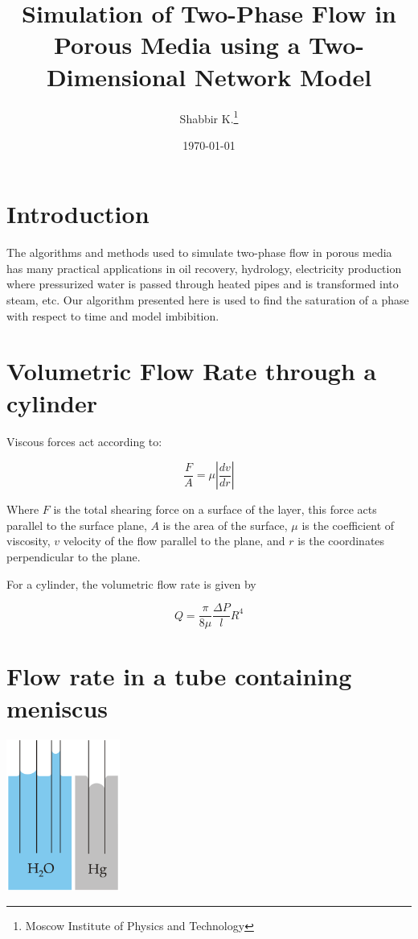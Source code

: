 \documentclass[12pt]{report}
\title{Simulation of Two-Phase Flow in Porous Media using a Two-Dimensional Network Model}
\author{Shabbir K.\thanks{Moscow Institute of Physics and Technology}}
\date{\today}
\begin{document}
\maketitle

\section{Introduction}
The algorithms and methods used to simulate two-phase flow in porous media has many practical applications in oil recovery, hydrology, electricity production where pressurized water is passed through heated pipes and is transformed into steam, etc. Our algorithm presented here is used to find the saturation of a phase with respect to time and model imbibition.

\section{Volumetric Flow Rate through a cylinder}

	Viscous forces act according to:

	\[ \frac{F}{A} = \mu \left| \frac{dv}{dr} \right| \]

	Where $F$ is the total shearing force on a surface of the layer, this force acts parallel to the surface plane, $A$ is the area of the surface, $\mu$ is the coefficient of viscosity, $v$ velocity of the flow parallel to the plane, and $r$ is the coordinates perpendicular to the plane.

	For a cylinder, the volumetric flow rate is given by

	\begin{equation} \label{eq:flow-rate}
	\boxed{Q = \frac{\pi}{8\mu}\frac{\Delta P}{l} R^4}
	\end{equation}


\section{Flow rate in a tube containing meniscus}

	\includegraphics[height=5cm]{fig_capact-of-water} \label{fig_capact-of-water}
\end{document}
